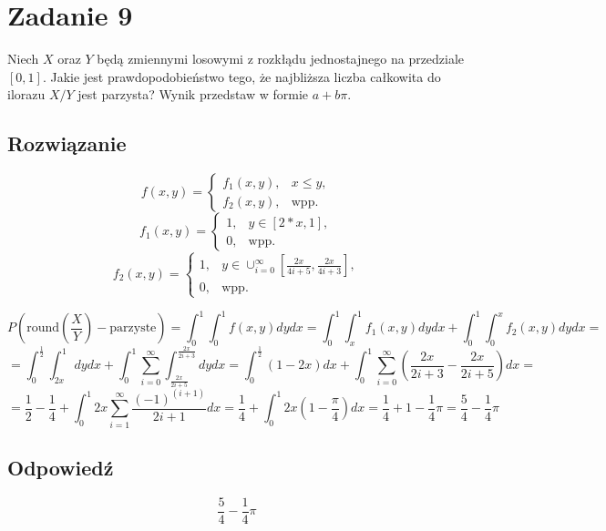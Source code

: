 \section{Zadanie 9}
Niech \(X\) oraz \(Y\) będą zmiennymi losowymi z rozkłądu jednostajnego na przedziale \([0, 1]\).
Jakie jest prawdopodobieństwo tego, że najbliższa liczba całkowita do ilorazu \(X/Y\) jest parzysta?
Wynik przedstaw w formie \(a + b\pi\).

\subsection*{Rozwiązanie}
\[f(x, y) = \begin{cases}
		f_{1}(x, y), & x \leqslant y, \\
		f_{2}(x, y), & \text{wpp}.
	\end{cases}
\]
\[
	f_{1}(x, y) = \begin{cases}
		1, & y \in [2*x, 1], \\
		0, & \text{wpp}.
	\end{cases}
\]
\[
	f_{2}(x, y) = \begin{cases}
		1, & y \in \cup_{i=0}^{\infty}[\frac{2x}{4i+5}, \frac{2x}{4i+3}], \\
		0, & \text{wpp}.
	\end{cases}
\]

\[ P(\text{round}(\frac{X}{Y}) - \text{parzyste}) = \int_{0}^{1}\int_{0}^{1}f(x, y)dydx = \int_{0}^{1}\int_{x}^{1}f_1(x, y)dydx + \int_{0}^{1}\int_{0}^{x}f_2(x, y)dydx = \]
\[ = \int_{0}^{\frac{1}{2}}\int_{2x}^{1}dydx + \int_{0}^{1}\sum_{i=0}^{\infty}\int_{\frac{2x}{2i+5}}^{\frac{2x}{2i+3}}dydx = \int_{0}^{\frac{1}{2}}(1 - 2x)dx + \int_{0}^{1}\sum_{i=0}^{\infty}(\frac{2x}{2i+3} - \frac{2x}{2i+5})dx = \]
\[ = \frac{1}{2} - \frac{1}{4} + \int_{0}^{1}2x\sum_{i=1}^{\infty}\frac{(-1)^{(i+1)}}{2i + 1}dx = \frac{1}{4} + \int_{0}^{1}2x(1 - \frac{\pi}{4})dx = \frac{1}{4} + 1 - \frac{1}{4}\pi = \frac{5}{4} - \frac{1}{4}\pi\]

\subsection*{Odpowiedź}
\[
	\boxed{\frac{5}{4} - \frac{1}{4}\pi}
\]
